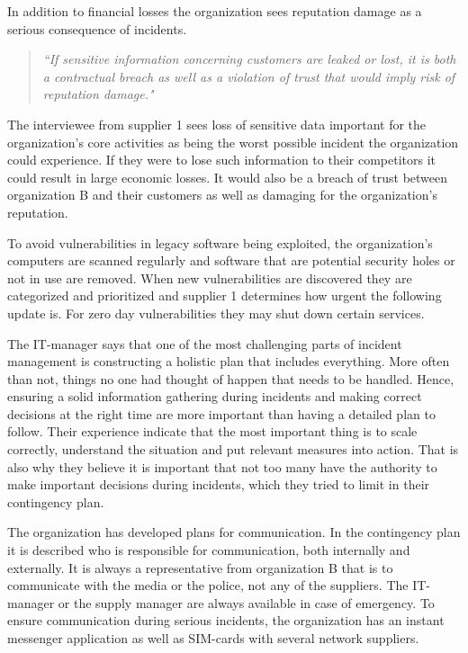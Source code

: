 In addition to financial losses the organization sees reputation damage as a serious consequence of incidents. 
\begin{quote}
\textit{``If sensitive information concerning customers are leaked or lost, it is both a contractual breach as well as a violation of trust that would imply risk of reputation damage."}
\end{quote}

The interviewee from supplier 1 sees loss of sensitive data important for the organization's core activities as being the worst possible incident the organization could experience. If they were to lose such information to their competitors it could result in large economic losses. It would also be a breach of trust between organization B and their customers as well as damaging for the organization's reputation.	

To avoid vulnerabilities in legacy software being exploited, the organization's computers are scanned regularly and software that are potential security holes or not in use are removed. When new vulnerabilities are discovered they are categorized and prioritized and supplier 1 determines how urgent the following update is. For zero day vulnerabilities they may shut down certain services.

The IT-manager says that one of the most challenging parts of incident management is constructing a holistic plan that includes everything. More often than not, things no one had thought of happen that needs to be handled. Hence, ensuring a solid information gathering during incidents and making correct decisions at the right time are more important than having a detailed plan to follow. Their experience indicate that the most important thing is to scale correctly, understand the situation and put relevant measures into action. That is also why they believe it is important that not too many have the authority to make important decisions during incidents, which they tried to limit in their contingency plan.

The organization has developed plans for communication. In the contingency plan it is described who is responsible for communication, both internally and externally. It is always a representative from organization B that is to communicate with the media or the police, not any of the suppliers. The IT-manager or the supply manager are always available in case of emergency. To ensure communication during serious incidents, the organization has an instant messenger application as well as SIM-cards with several network suppliers. 

